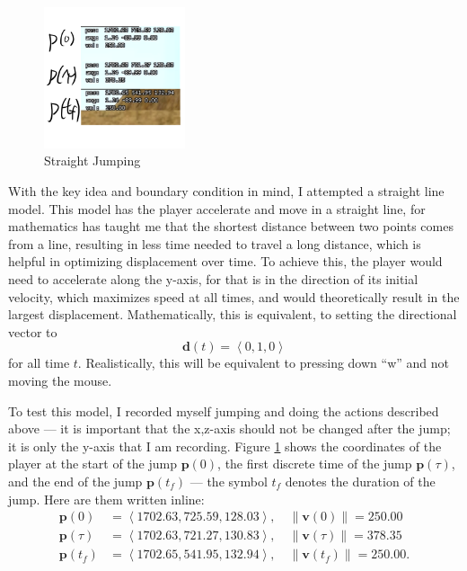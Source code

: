 \documentclass[a4paper,12pt]{article}
\newcommand{\tvec}[1]{\boldsymbol{#1}}
\newcommand{\tmag}[1]{\|#1\|}
\newcommand{\tang}[1]{\left\langle #1 \right\rangle}
\newcommand{\td}{\tvec{d}}
\newcommand{\tv}{\tvec{v}}
\newcommand{\tp}{\tvec{p}}
\begin{document}
\begin{figure}
    \includegraphics[width=0.37\textwidth,right]{assets/2straightjumping.png}
    \caption{Straight Jumping}
    \label{fig:2straightjumping}
\end{figure}
With the key idea and boundary condition in mind, I attempted a straight line model. This model has the player accelerate and move in a straight line, for mathematics has taught me that the shortest distance between two points comes from a line, resulting in less time needed to travel a long distance, which is helpful in optimizing displacement over time. To achieve this, the player would need to accelerate along the y-axis, for that is in the direction of its initial velocity, which maximizes speed at all times, and would theoretically result in the largest displacement. Mathematically, this is equivalent, to setting the directional vector to
\[
    \td(t) = \tang{0, 1, 0}
\]
for all time $t$. Realistically, this will be equivalent to pressing down ``w'' and not moving the mouse.

To test this model, I recorded myself jumping and doing the actions described above --- it is important that the x,z-axis should not be changed after the jump; it is only the y-axis that I am recording. Figure \ref{fig:2straightjumping} shows the coordinates of the player at the start of the jump $\tp(0)$, the first discrete time of the jump $\tp(\tau)$, and the end of the jump $\tp(t_f)$ --- the symbol $t_f$ denotes the duration of the jump. Here are them written inline:
\begin{align}
 \tp(0) &= \tang{1702.63, 725.59, 128.03}, \quad \tmag{\tv(0)} = 250.00 \label{eq:2emp0}\\
 \tp(\tau) &= \tang{1702.63, 721.27, 130.83}, \quad \tmag{\tv(\tau)} = 378.35 \label{eq:2emp1}\\
 \tp(t_f) &= \tang{1702.65,541.95, 132.94}, \quad \tmag{\tv(t_f)} = 250.00 \label{eq:2emp2}.
\end{align}
\end{document}
